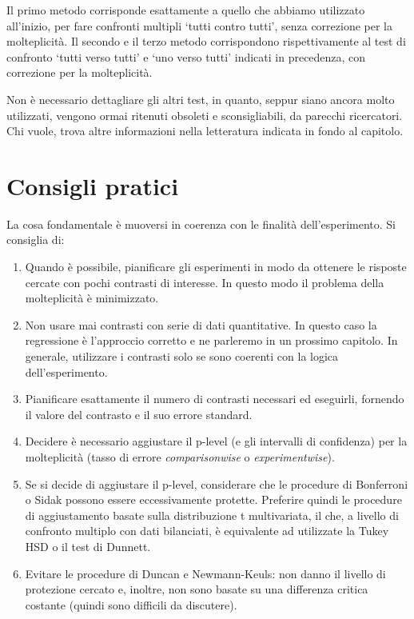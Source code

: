 \documentclass[a4paper,12pt,oneside]{book}
\providecommand{\tightlist}{%
  \setlength{\itemsep}{0pt}\setlength{\parskip}{0pt}}
\begin{document}
Il primo metodo corrisponde esattamente a quello che abbiamo utilizzato all'inizio, per fare confronti multipli `tutti contro tutti', senza correzione per la molteplicità. Il secondo e il terzo metodo corrispondono rispettivamente al test di confronto `tutti verso tutti' e `uno verso tutti' indicati in precedenza, con correzione per la molteplicità.

Non è necessario dettagliare gli altri test, in quanto, seppur siano ancora molto utilizzati, vengono ormai ritenuti obsoleti e sconsigliabili, da parecchi ricercatori. Chi vuole, trova altre informazioni nella letteratura indicata in fondo al capitolo.

\hypertarget{consigli-pratici}{%
\section{Consigli pratici}\label{consigli-pratici}}

La cosa fondamentale è muoversi in coerenza con le finalità dell'esperimento. Si consiglia di:

\begin{enumerate}
\def\labelenumi{\arabic{enumi}.}
\tightlist
\item
  Quando è possibile, pianificare gli esperimenti in modo da ottenere le risposte cercate con pochi contrasti di interesse. In questo modo il problema della molteplicità è minimizzato.
\item
  Non usare mai contrasti con serie di dati quantitative. In questo caso la regressione è l'approccio corretto e ne parleremo in un prossimo capitolo. In generale, utilizzare i contrasti solo se sono coerenti con la logica dell'esperimento.
\item
  Pianificare esattamente il numero di contrasti necessari ed eseguirli, fornendo il valore del contrasto e il suo errore standard.
\item
  Decidere è necessario aggiustare il p-level (e gli intervalli di confidenza) per la molteplicità (tasso di errore \emph{comparisonwise} o \emph{experimentwise}).
\item
  Se si decide di aggiustare il p-level, considerare che le procedure di Bonferroni o Sidak possono essere eccessivamente protette. Preferire quindi le procedure di aggiustamento basate sulla distribuzione t multivariata, il che, a livello di confronto multiplo con dati bilanciati, è equivalente ad utilizzate la Tukey HSD o il test di Dunnett.
\item
  Evitare le procedure di Duncan e Newmann-Keuls: non danno il livello di protezione cercato e, inoltre, non sono basate su una differenza critica costante (quindi sono difficili da discutere).
\end{enumerate}
\end{document}
